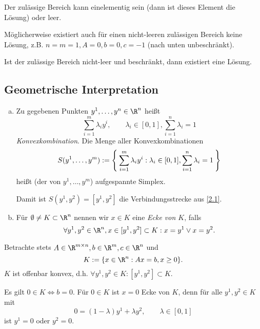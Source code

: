 \begin{nt} \label{3.2}
	Der zulässige Bereich kann einelementig sein (dann ist dieses Element die Lösung) oder leer.

	Möglicherweise existiert auch für einen nicht-leeren zulässigen Bereich keine Lösung, z.B. $n=m=1, A = 0, b=0, c=-1$ (nach unten unbeschränkt).

	Ist der zulässige Bereich nicht-leer und beschränkt, dann existiert eine Lösung.
\end{nt}

\subsection{Geometrische Interpretation}

\begin{df} \label{3.3}
	\begin{enumerate}[(a)]
		\item
			Zu gegebenen Punkten $y^1, \dotsc, y^n \in \R^n$ heißt
			\[
				\sum_{i=1}^m \lambda_i y^i,
				\qquad
				\lambda_i \in [0,1], \sum_{i=1}^n \lambda_i = 1
			\]
			\emph{Konvexkombination}.
			Die Menge aller Konvexkombinationen
			\[
				S(y^1, \dotsc, y^m) := \Set{
					\sum_{i=1}^m \lambda_i y^i:
					\lambda_i \in [0,1], \sum_{i=1}^n \lambda_i = 1
				}
			\]
			heißt (der von $y^1,\dotsc, y^m$) aufgespannte Simplex.

			Damit ist $S(y^1, y^2) = [y^1, y^2]$ die Verbindungsstrecke aus \ref{2.1}.
		\item
			Für $\emptyset \neq K \subset \R^n$ nennen wir $x \in K$ eine \emph{Ecke von $K$}, falls
			\[
				\forall y^1, y^2 \in \R^n, x \in [y^1, y^2] \subset K : x = y^1 \lor x = y^2.
			\]
	\end{enumerate}
\end{df}

Betrachte stets $A \in \R^{m\times n}, b\in \R^m, c \in \R^n$ und
\[
	K:= \{ x \in \R^n : Ax = b, x \ge 0 \}.
\]
$K$ ist offenbar konvex, d.h. $\forall y^1, y^2 \in K : [y^1, y^2] \subset K$.

\begin{ex} \label{3.4}
	Es gilt $0 \in K \iff b = 0$.
	Für $0 \in K$ ist $x = 0$ Ecke von $K$, denn für alle $y^1, y^2 \in K$ mit
	\[
		0 = (1-\lambda) y^1 + \lambda y^2,
		\qquad \lambda \in [0,1]
	\]
	ist $y^1 = 0$ oder $y^2 = 0$.
\end{ex}

